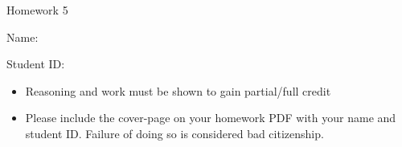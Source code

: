 \documentclass[11pt]{exam}
\begin{document}
\centerline{\Large \sc Homework 5}
\pagestyle{empty}

\hrulefill

\vspace{2cm}


{\Large \sc Name:}



\vspace{2cm}



{\Large \sc Student ID:}

\vspace{6cm}

\begin{itemize}
  \item Reasoning and work must be shown to gain partial/full
  credit
  \item Please include the cover-page on your homework PDF with your name and student ID. Failure of doing so is considered bad citizenship. 

 \end{itemize}
\end{document}
